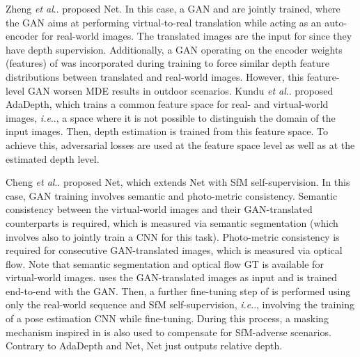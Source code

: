 \documentclass[journal]{IEEEtran}
\makeatletter
\DeclareRobustCommand\onedot{\futurelet\@let@token\@onedot}
\def\@onedot{\ifx\@let@token.\else.\null\fi\xspace}
\def\ie{\emph{i.e}\onedot} \def\Ie{\emph{I.e}\onedot}
\def\etal{\emph{et al}\onedot}
\makeatother
\begin{document}
Zheng {\etal} \cite{Zheng:2018T2Net} proposed Net. In this case, a GAN and  are jointly trained, where the GAN aims at performing virtual-to-real translation while acting as an auto-encoder for real-world images. The translated images are the input for  since they have depth supervision. Additionally, a GAN operating on the encoder weights (features) of  was incorporated during training to force similar depth feature distributions between translated and real-world images. However, this feature-level GAN worsen MDE results in outdoor scenarios. Kundu {\etal} \cite{Kundu:2018AdaDepth} proposed AdaDepth, which trains a common feature space for real- and virtual-world images, {\ie}, a space where it is not possible to distinguish the domain of the input images. Then, depth estimation is trained from this feature space. To achieve this, adversarial losses are used at the feature space level as well as at the estimated depth level. 

Cheng {\etal} \cite{Cheng:2020S3Net} proposed Net, which extends Net with SfM self-supervision. In this case, GAN training involves semantic and photo-metric consistency. Semantic consistency between the virtual-world images and their GAN-translated counterparts is required, which is measured via semantic segmentation (which involves also to jointly train a CNN for this task). Photo-metric consistency is required for consecutive GAN-translated images, which is measured via optical flow. Note that semantic segmentation and optical flow GT is available for virtual-world images.  uses the GAN-translated images as input and is trained end-to-end with the GAN. Then, a further fine-tuning step of  is performed using only the real-world sequence and SfM self-supervision, {\ie}, involving the training of a pose estimation CNN while fine-tuning. During this process, a masking mechanism inspired in \cite{Godard:2019MonoDepth2} is also used to compensate for SfM-adverse scenarios. Contrary to AdaDepth and Net, Net just outputs relative depth. 
\end{document}
